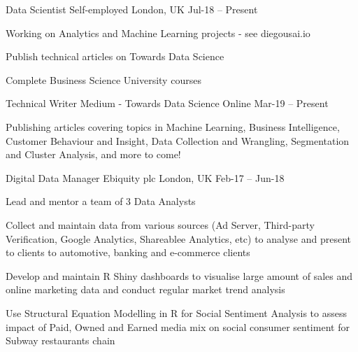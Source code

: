 

\begin{cventries}

  \cventry
    {Data Scientist} %
    {Self-employed} %
    {London, UK} %
    {Jul-18 – Present} %
    {
      \begin{cvitems} %
        \item {Working on Analytics and Machine Learning projects - see diegousai.io }
        \item {Publish technical articles on Towards Data Science}
        \item {Complete Business Science University courses}
      \end{cvitems}
    }

  \cventry
    {Technical Writer} %
    {Medium - Towards Data Science} %
    {Online} %
    {Mar-19 – Present} %
    {
      \begin{cvitems} %
        \item {Publishing articles covering topics in Machine Learning, Business Intelligence, Customer Behaviour and Insight, Data Collection and Wrangling, Segmentation and Cluster Analysis, and more to come!}
      \end{cvitems}
    }

  \cventry
    {Digital Data Manager} %
    {Ebiquity plc} %
    {London, UK} %
    {Feb-17 – Jun-18} %
    {
      \begin{cvitems} %
        \item {Lead and mentor a team of 3 Data Analysts}
        \item {Collect and maintain data from various sources (Ad Server, Third-party Verification, Google Analytics, Shareablee Analytics, etc) to analyse and present to clients to automotive, banking and e-commerce clients}
        \item {Develop and maintain R Shiny dashboards to visualise large amount of sales and online marketing data and conduct regular market trend analysis}
        \item {Use Structural Equation Modelling in R for Social Sentiment Analysis to assess impact of Paid, Owned and Earned media mix on social consumer sentiment for Subway restaurants chain}
      \end{cvitems}
    }


\end{cventries}
